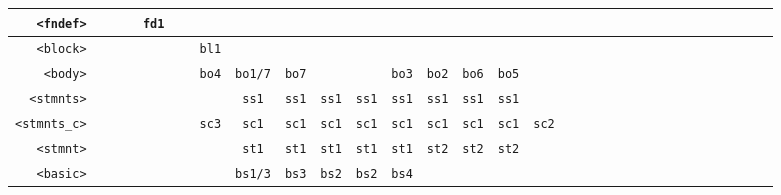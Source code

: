 \documentclass[11pt,a4paper]{article}
\newcommand*\id[1]{\texttt{#1}}
\begin{document}
\begin{table}[H]
\begin{adjustbox}{width=\textwidth}
\begin{tabular}{|r||c|c|c|c|c|c|c|c|c|c|c|c|c|c|c|c|c|c|c|c|c|c|c|c|}
        \id{<fndef>}         & \id{   }                 & \id{   }    & \id{fd1}  & \id{   }  & \id{   }   & \id{   }   & \id{   }    & \id{   }  & \id{   }  & \id{   }     & \id{   } & \id{   }    & \id{   }  & \id{   }     & \id{   }   & \id{   } & \id{   } & \id{   }    & \id{   } & \id{   } & \id{   } & \id{   } & \id{   } & \id{   } \\ \hline
        \id{<block>}         & \id{   }                 & \id{   }    & \id{   }  & \id{   }  & \id{bl1}   & \id{   }   & \id{   }    & \id{   }  & \id{   }  & \id{   }     & \id{   } & \id{   }    & \id{   }  & \id{   }     & \id{   }   & \id{   } & \id{   } & \id{   }    & \id{   } & \id{   } & \id{   } & \id{   } & \id{   } & \id{   } \\ \hline
        \id{<body>}          & \id{   }                 & \id{   }    & \id{   }  & \id{   }  & \id{bo4}   & \id{bo1/7} & \id{bo7}    & \id{   }  & \id{   }  & \id{bo3}     & \id{bo2} & \id{bo6}    & \id{bo5}  & \id{   }     & \id{   }   & \id{   } & \id{   } & \id{   }    & \id{   } & \id{   } & \id{   } & \id{   } & \id{   } & \id{   } \\ \hline
        \id{<stmnts>}        & \id{   }                 & \id{   }    & \id{   }  & \id{   }  & \id{   }   & \id{ss1}   & \id{ss1}    & \id{ss1}  & \id{ss1}  & \id{ss1}     & \id{ss1} & \id{ss1}    & \id{ss1}  & \id{   }     & \id{   }   & \id{   } & \id{   } & \id{   }    & \id{   } & \id{   } & \id{   } & \id{   } & \id{   } & \id{   } \\ \hline
        \id{<stmnts\_c>}     & \id{   }                 & \id{   }    & \id{   }  & \id{   }  & \id{sc3}   & \id{sc1}   & \id{sc1}    & \id{sc1}  & \id{sc1}  & \id{sc1}     & \id{sc1} & \id{sc1}    & \id{sc1}  & \id{sc2}     & \id{   }   & \id{   } & \id{   } & \id{   }    & \id{   } & \id{   } & \id{   } & \id{   } & \id{   } & \id{   } \\ \hline
        \id{<stmnt>}         & \id{   }                 & \id{   }    & \id{   }  & \id{   }  & \id{   }   & \id{st1}   & \id{st1}    & \id{st1}  & \id{st1}  & \id{st1}     & \id{st2} & \id{st2}    & \id{st2}  & \id{   }     & \id{   }   & \id{   } & \id{   } & \id{   }    & \id{   } & \id{   } & \id{   } & \id{   } & \id{   } & \id{   } \\ \hline
        \id{<basic>}         & \id{   }                 & \id{   }    & \id{   }  & \id{   }  & \id{   }   & \id{bs1/3} & \id{bs3}    & \id{bs2}  & \id{bs2}  & \id{bs4}     & \id{   } & \id{   }    & \id{   }  & \id{   }     & \id{   }   & \id{   } & \id{   } & \id{   }    & \id{   } & \id{   } & \id{   } & \id{   } & \id{   } & \id{   } \\ \hline

\end{tabular}
\end{adjustbox}
\end{table}
\end{document}
